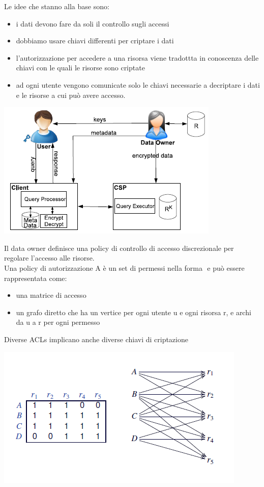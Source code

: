 Le idee che stanno alla base sono: 
\begin{itemize}
    \item i dati devono fare da soli il controllo sugli accessi
    \item dobbiamo usare chiavi differenti per criptare i dati
    \item l'autorizzazione per accedere a una risorsa viene tradottta in conoscenza delle chiavi con le quali le risorse sono criptate
    \item ad ogni utente vengono comunicate solo le chiavi necessarie a decriptare i dati e le risorse a cui può avere accesso.
\end{itemize}
\begin{center}
    \includegraphics[scale=0.6]{img/selencscen.png}
\end{center}
Il data owner definisce una policy di controllo di accesso discrezionale per regolare l'accesso alle risorse. \\
Una policy di autorizzazione A è un set di permessi nella forma \(<user, resource>\) e può essere rappresentata come:
\begin{itemize}
    \item una matrice di accesso
    \item un grafo diretto che ha un vertice per ogni utente u e ogni risorsa r, e archi da u a r per ogni permesso \(<u, r>\)
\end{itemize}
Diverse ACLs implicano anche diverse chiavi di criptazione
\begin{center}
    \includegraphics[scale=0.6]{img/authpolicy.png}
\end{center}
